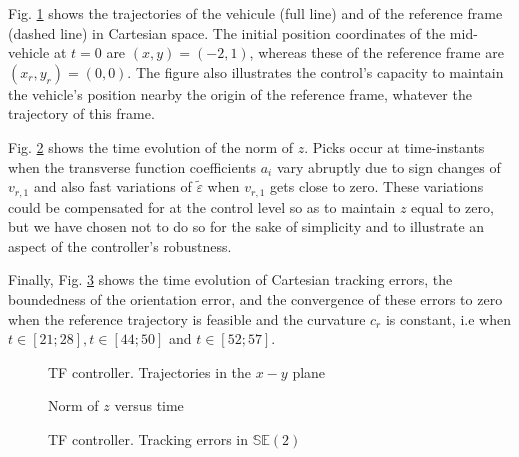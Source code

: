 \documentclass[a4paper,twoside]{article}
\def \eps {\varepsilon}
\def \SE {{\mathbb S}{\mathbb E}}
\begin{document}
Fig. \ref{fig1} shows the trajectories of the vehicule (full line) and of the reference frame (dashed line) in 
Cartesian space. The initial position coordinates of the mid-vehicle at $t=0$ are $(x,y)= (-2,1)$, whereas these of the reference frame are $(x_r,y_r)= (0,0)$. The figure also illustrates the control's capacity to maintain the vehicle's position nearby the origin of the reference frame, whatever the trajectory of this frame.

Fig. \ref{fig2} shows the time evolution of the norm of $z$. Picks occur at time-instants when the transverse function coefficients $a_i$ vary abruptly due to sign changes of $v_{r,1}$ and also fast variations of $\tilde{\eps}$ when $v_{r,1}$ gets close to zero. These
variations could be compensated for at the control level so as to maintain $z$ equal to zero, but we 
have chosen not to do so for the sake of simplicity and to illustrate an aspect of the controller's robustness.

Finally, Fig. \ref{fig3} shows the time evolution of Cartesian tracking errors, the boundedness of the orientation error, and the 
convergence of these errors to zero when the reference trajectory is feasible and the curvature $c_r$
is constant, i.e when $t \in [21;28], t \in [44;50]$ and  $t \in [52;57]$.

\begin{figure}[htb]
\begin{center}
\end{center}
\caption{TF controller. Trajectories in the $x-y$ plane}
\label{fig1}
\end{figure}

\begin{figure}[htb]
\begin{center}
\end{center}
\caption{Norm of $z$ versus time}
\label{fig2}
\end{figure}

\begin{figure}[htb]
\begin{center}
\end{center}
\caption{TF controller. Tracking errors in $\SE(2)$}
\label{fig3}
\end{figure}
\end{document}

